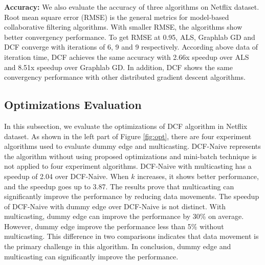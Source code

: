 \documentclass{llncs}
\begin{document}
\textbf{Accuracy:} We also evaluate the accuracy of three algorithms on Netflix dataset. Root mean square error (RMSE) \cite{towards} is the general metrics for model-based collaborative filtering algorithms. With smaller RMSE, the algorithms show better convergency performance. To get RMSE at 0.95, ALS, Graphlab GD and DCF converge with iterations of 6, 9 and 9 respectively. According above data of iteration time, DCF achieves the same accuracy with 2.66x speedup over ALS and 8.51x speedup over Graphlab GD. In addition, DCF shows the same convergency performance with other distributed gradient descent algorithms.


\vspace{-10pt}
\subsection{Optimizations Evaluation}
\vspace{-5pt}
\label{sub:opt}

In this subsection, we evaluate the optimizations of DCF algorithm in Netflix dataset. As shown in the left part of Figure \ref{fig:opt}, there are four experiment algorithms used to evaluate dummy edge and multicasting. DCF-Naive represents the algorithm without using proposed optimizations and mini-batch technique is not applied to four experiment algorithms. DCF-Naive with multicasting has a speedup of 2.04 over DCF-Naive. When $k$ increases, it shows better performance, and the speedup goes up to 3.87. The results prove that multicasting can significantly improve the performance by reducing data movements. The speedup of DCF-Naive with dummy edge over DCF-Naive is not distinct. With multicasting, dummy edge can improve the performance by 30\% on average. However, dummy edge improve the performance less than 5\% without multicasting. This difference in two comparisons indicates that data movement is the primary challenge in this algorithm. In conclusion, dummy edge and multicasting can significantly improve the performance.
\end{document}
